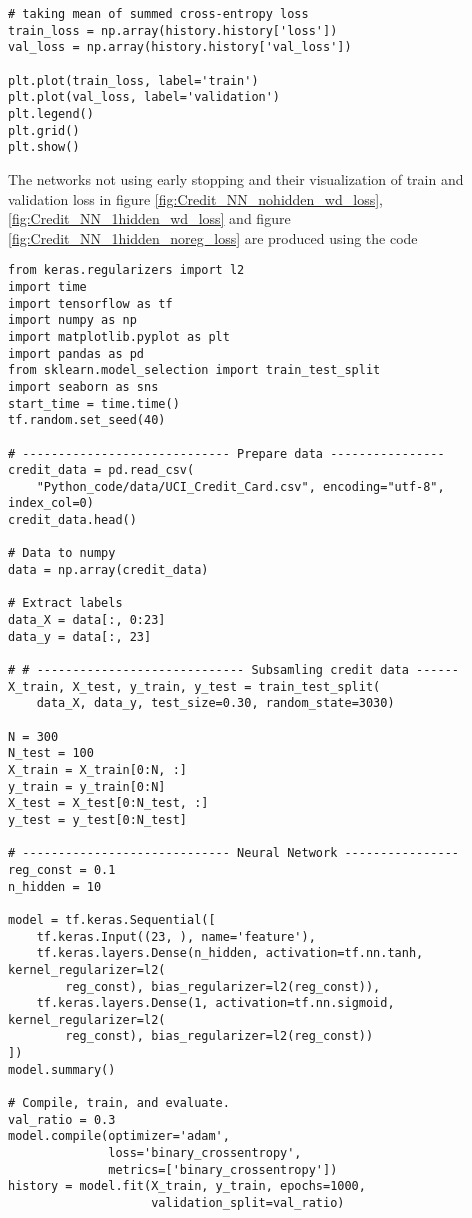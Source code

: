 \begin{appendices}
\begin{lstlisting}
# taking mean of summed cross-entropy loss
train_loss = np.array(history.history['loss'])
val_loss = np.array(history.history['val_loss'])

plt.plot(train_loss, label='train')
plt.plot(val_loss, label='validation')
plt.legend()
plt.grid()
plt.show()

\end{lstlisting}
The networks not using early stopping and their visualization of train and validation loss in figure \ref{fig:Credit_NN_nohidden_wd_loss}, \ref{fig:Credit_NN_1hidden_wd_loss} and figure \ref{fig:Credit_NN_1hidden_noreg_loss} are produced using the code
\begin{lstlisting}
from keras.regularizers import l2
import time
import tensorflow as tf
import numpy as np
import matplotlib.pyplot as plt
import pandas as pd
from sklearn.model_selection import train_test_split
import seaborn as sns
start_time = time.time()
tf.random.set_seed(40)

# ----------------------------- Prepare data ----------------
credit_data = pd.read_csv(
    "Python_code/data/UCI_Credit_Card.csv", encoding="utf-8", index_col=0)
credit_data.head()

# Data to numpy
data = np.array(credit_data)

# Extract labels
data_X = data[:, 0:23]
data_y = data[:, 23]

# # ----------------------------- Subsamling credit data ------
X_train, X_test, y_train, y_test = train_test_split(
    data_X, data_y, test_size=0.30, random_state=3030)

N = 300
N_test = 100
X_train = X_train[0:N, :]
y_train = y_train[0:N]
X_test = X_test[0:N_test, :]
y_test = y_test[0:N_test]

# ----------------------------- Neural Network ----------------
reg_const = 0.1
n_hidden = 10

model = tf.keras.Sequential([
    tf.keras.Input((23, ), name='feature'),
    tf.keras.layers.Dense(n_hidden, activation=tf.nn.tanh, kernel_regularizer=l2(
        reg_const), bias_regularizer=l2(reg_const)),
    tf.keras.layers.Dense(1, activation=tf.nn.sigmoid, kernel_regularizer=l2(
        reg_const), bias_regularizer=l2(reg_const))
])
model.summary()

# Compile, train, and evaluate.
val_ratio = 0.3
model.compile(optimizer='adam',
              loss='binary_crossentropy',
              metrics=['binary_crossentropy'])
history = model.fit(X_train, y_train, epochs=1000,
                    validation_split=val_ratio)


\end{lstlisting}
\end{appendices}
